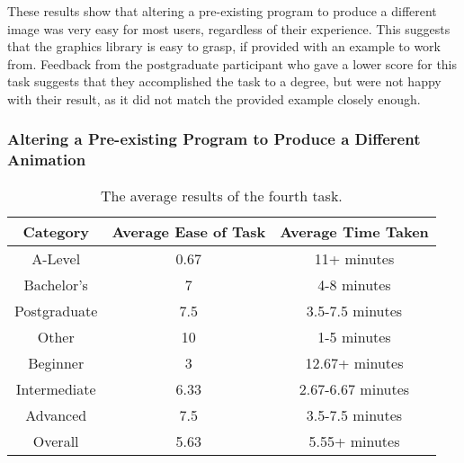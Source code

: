 \documentclass[../main.tex]{subfiles}
\begin{document}
                These results show that altering a pre-existing program to produce a different
                    image was very easy for most users, regardless of their experience.
                This suggests that the graphics library is easy to grasp, if provided with an
                    example to work from.
                Feedback from the postgraduate participant who gave a lower score for this task
                    suggests that they accomplished the task to a degree, but were not happy with
                    their result, as it did not match the provided example closely enough.

            \subsubsection{Altering a Pre-existing Program to Produce a Different Animation}
                \begin{table}[H]
                    \centering
                    \begin{tabular}{c|c|c}
                        \textbf{Category} & \textbf{Average Ease of Task} & \textbf{Average Time Taken} \\
                        \hline
                        A-Level           & 0.67                          & 11+ minutes                 \\
                        Bachelor's        & 7                             & 4-8 minutes                 \\
                        Postgraduate      & 7.5                           & 3.5-7.5 minutes             \\
                        Other             & 10                            & 1-5 minutes                 \\
                        \hline
                        Beginner          & 3                             & 12.67+ minutes              \\
                        Intermediate      & 6.33                          & 2.67-6.67 minutes           \\
                        Advanced          & 7.5                           & 3.5-7.5 minutes             \\
                        \hline
                        Overall           & 5.63                          & 5.55+ minutes               \\
                    \end{tabular}
                    \caption{The average results of the fourth task.}
                \end{table}
\end{document}
